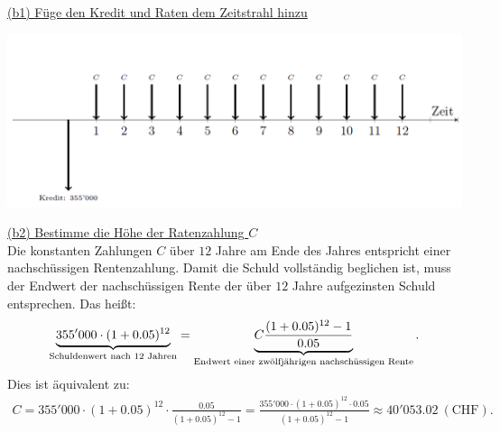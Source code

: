 \newpage
\underline{(b1) Füge den Kredit und Raten dem Zeitstrahl hinzu}\\
\begin{center}
	\includegraphics[scale=0.55]{pictures/zeitstrahl_1_b_filled_1}
\end{center}

\underline{(b2) Bestimme die Höhe der Ratenzahlung $ C $}\\
Die konstanten Zahlungen $ C $ über $ 12 $ Jahre am Ende des Jahres entspricht einer nachschüssigen Rentenzahlung.
Damit die Schuld vollständig beglichen ist, muss der Endwert der nachschüssigen Rente der über $ 12 $ Jahre aufgezinsten Schuld entsprechen.
Das heißt:
\begin{align*}
	\underbrace{355'000 \cdot (1+ 0.05)^{12}}_{\textrm{Schuldenwert nach $ 12 $ Jahren}}
	=
	\underbrace{C \frac{(1+0.05)^{12} -1}{0.05}}_{\textrm{Endwert einer zwölfjährigen nachschüssigen Rente}}.
\end{align*}
Dies ist äquivalent zu:
\begin{align*}
	C = 355'000 \cdot (1+ 0.05)^{12} \cdot \frac{0.05}{(1+0.05)^{12} -1}
	=
	\frac{355'000\cdot (1+ 0.05)^{12} \cdot 0.05 }{(1+0.05)^{12} -1}
	\approx
	40'053.02 \ \mathrm{(CHF)}.
\end{align*}

